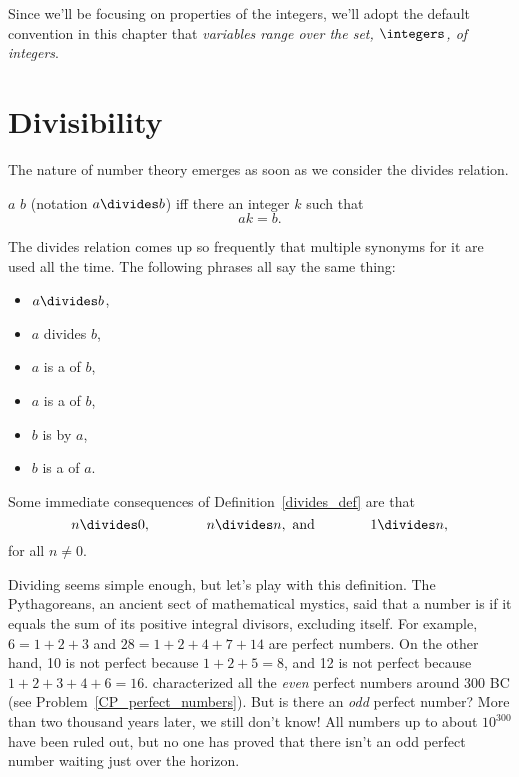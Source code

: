 
Since we'll be focusing on properties of the integers, we'll adopt the default convention
in this chapter that \emph{variables range over the set, $\integers$, of integers}.

\section{Divisibility}\label{divisibility_sec}

The nature of number theory emerges as soon as we consider the divides relation.
\begin{definition}\label{divides_def}
$a$  $b$ (notation $a \divides b$) iff there an integer $k$ such that
\[
ak = b.
\]
\end{definition}
The divides relation comes up so frequently that multiple synonyms for it are used all the
time.  The following phrases all say the same thing:
\begin{itemize}
\item $a \divides b$,
\item $a$ divides $b$,
\item $a$ is a  of $b$,
\item $a$ is a  of $b$,
\item $b$ is  by $a$,
\item $b$ is a  of $a$.
\end{itemize}
Some immediate consequences of Definition~\ref{divides_def} are that
\[
n  \divides 0,\qquad\qquad
n  \divides n, \text{ and}\qquad\qquad
1  \divides n,
\]
for all $n \neq 0$.

Dividing seems simple enough, but let's play with this definition.  The Pythagoreans, an
ancient sect of mathematical mystics, said that a number is  if it equals the sum of its positive integral divisors, excluding
itself.  For example, $6 = 1 + 2 + 3$ and $28 = 1 + 2 + 4 + 7 + 14$ are perfect numbers.
On the other hand, 10 is not perfect because $1 + 2 + 5 = 8$, and 12 is not perfect because
$1 + 2 + 3 + 4 + 6 = 16$.   characterized all the \emph{even} perfect numbers
around 300 BC (see Problem~\ref{CP_perfect_numbers}).  But is there an \emph{odd} perfect
number?  More than two thousand years later, we still don't know!  All numbers up to about
$10^{300}$ have been ruled out, but no one has proved that there isn't an odd perfect
number waiting just over the horizon.

